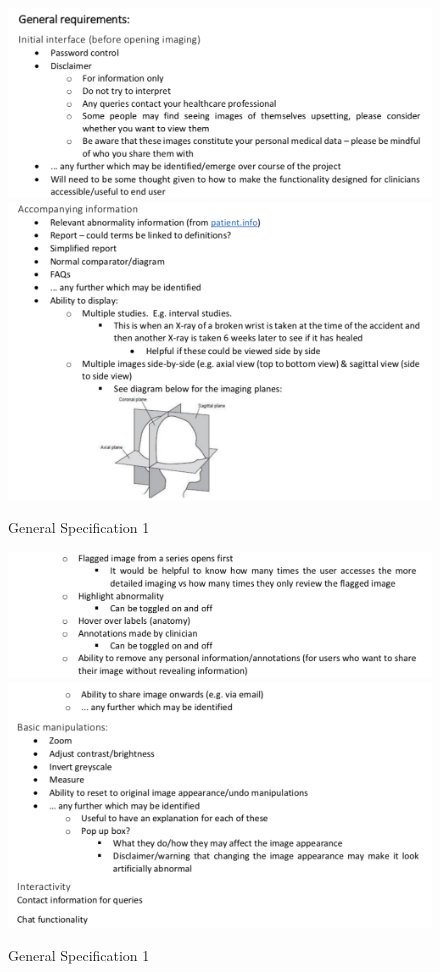 \begin{figure}[ht]
\centering
\includegraphics[width = 0.95\hsize]{./figures/GeneralSpec1}
\includegraphics[width = 0.95\hsize]{./figures/GeneralSpec2}
\caption{General Specification 1}
\end{figure}



\clearpage

\begin{figure}[ht]
\centering
\includegraphics[width = 0.95\hsize]{./figures/GeneralSpec3}
\includegraphics[width = 0.95\hsize]{./figures/GeneralSpec4}
\caption{General Specification 1}
\end{figure}